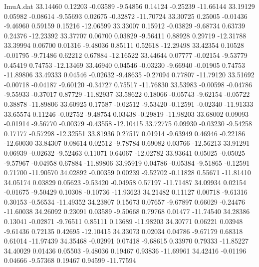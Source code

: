 \begin{filecontents}{ImuA.dat}
  33.14460    0.12203   -0.03589   -9.54856    0.14124   -0.25239  -11.66144
  33.19129    0.05982   -0.08614   -9.55693    0.02675   -0.32872  -11.70724
  33.30725    0.25005   -0.01436   -9.46960    0.59159    0.15216  -12.06599
  33.33007    0.15912   -0.03829   -9.68734    0.63739    0.24376  -12.23392
  33.37707    0.06700    0.03829   -9.56411    0.88928    0.29719  -12.31788
  33.39994    0.06700    0.01316   -9.48036    0.85111    0.52618  -12.29498
  33.42354    0.10528   -0.01795   -9.71486    0.62212    0.67884  -12.16522
  33.44644    0.07777   -0.02154   -9.53779    0.45419    0.74753  -12.13469
  33.46940    0.04546   -0.03230   -9.66940   -0.01905    0.74753  -11.89806
  33.49333    0.04546   -0.02632   -9.48635   -0.27094    0.77807  -11.79120
  33.51692   -0.00718   -0.04187   -9.60120   -0.34727    0.75517  -11.76830
  33.53983   -0.00598   -0.04786   -9.55933   -0.37017    0.87729  -11.82937
  33.58622    0.18066   -0.05743   -9.62154   -0.05722    0.38878  -11.89806
  33.60925    0.17587   -0.02512   -9.53420   -0.12591   -0.02340  -11.91333
  33.65574    0.11246   -0.02752   -9.48754    0.03438   -0.29819  -11.98203
  33.68002    0.09093   -0.01914   -9.56770   -0.00379   -0.43558  -12.10415
  33.72775    0.09930   -0.03230   -9.54258    0.17177   -0.57298  -12.32551
  33.81936    0.27517    0.01914   -9.63949    0.46946   -0.22186  -12.60030
  33.84307    0.08614    0.02512   -9.78784    0.69082    0.03766  -12.56213
  33.91291    0.06939   -0.02632   -9.52463    0.11071    0.64067  -12.02782
  33.93641    0.05025   -0.05025   -9.57967   -0.04958    0.67884  -11.89806
  33.95919    0.04786   -0.05384   -9.51865   -0.12591    0.71700  -11.90570
  34.02892   -0.00359    0.00239   -9.52702   -0.11828    0.55671  -11.81410
  34.05174    0.03829    0.05623   -9.53420   -0.04958    0.57197  -11.71487
  34.09934    0.02154   -0.01675   -9.50429    0.10308   -0.10736  -11.93623
  34.21482    0.11127    0.00718   -9.61316    0.30153   -0.56534  -11.49352
  34.23807    0.15673    0.07657   -9.67897    0.66029   -0.24476  -11.60038
  34.26092    0.23091    0.03589   -9.50668    0.79768    0.01477  -11.74540
  34.28386    0.13041   -0.02871   -9.76511    0.85111    0.13689  -11.98203
  34.30771    0.06221    0.03948   -9.61436    0.72135    0.42695  -12.10415
  34.33073    0.02034    0.04786   -9.67179    0.68318    0.61014  -11.97439
  34.35468   -0.02991    0.07418   -9.68615    0.33970    0.79333  -11.85227
  34.40029    0.01436    0.05503   -9.48036    0.19467    0.93836  -11.69961
  34.42416   -0.01196    0.04666   -9.57368    0.19467    0.94599  -11.77594

\end{filecontents}
